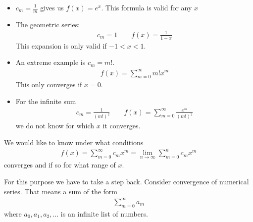\begin{ex}
	\begin{itemize}
		\item
	$c_m = \frac 1 m$ gives us $f(x) = e^x$. This formula is valid for any $x$
	\item
	The geometric series:
	\begin{align*}
		c_m = 1 \qquad f(x) = \frac 1 {1-x}
	\end{align*}
	This expansion is only valid if $-1<x<1$.
	\item
	An extreme example is
	$c_m = m!$.
	\begin{align*}
		 f(x) = \sum_{m=0}^\infty m! x^m
	\end{align*}
	This only converges if $x = 0$.
	\item
	For the infinite sum
	\begin{align*}
	c_m = \frac 1 {(m!)^2} \qquad f(x) = \sum_{m=0}^\infty \frac{x^m}{(m!)^2}
	\end{align*}
	we do not know for which $x$ it converges.
\end{itemize}
\end{ex}

We would like to know under what conditions 
\begin{align*}
f(x) = \sum_{m=0}^\infty c_m x^m = \lim_{n \to \infty} \sum_{m=0}^n c_m x^m
\end{align*}
converges and if so for what range of $x$.
	
For this purpose we have to take a step back. Consider convergence of numerical series. That means a sum of the form 
\begin{align*}
\sum_{m=0}^\infty a_m
\end{align*}
where $a_0,a_1, a_2, \dots $ is an infinite list of numbers.

